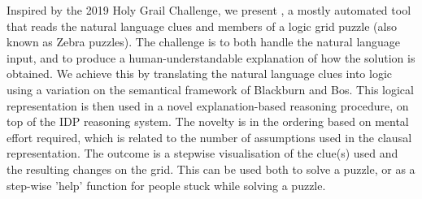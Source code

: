 Inspired by the 2019 Holy Grail Challenge, we present \ourtool, a mostly automated tool that reads the natural language clues and members of a logic grid puzzle (also known as Zebra puzzles). The challenge is to both handle the natural language input, and to produce a human-understandable explanation of how the solution is obtained.
We achieve this by translating the natural language clues into logic using a variation on the semantical framework of Blackburn and Bos. This logical representation is then used in a novel explanation-based reasoning procedure, on top of the IDP reasoning system. The novelty is in the ordering based on mental effort required, which is related to the number of assumptions used in the clausal representation. The outcome is a stepwise visualisation of the clue(s) used and the resulting changes on the grid.
This can be used both to solve a puzzle, or as a step-wise 'help' function for people stuck while solving a puzzle.